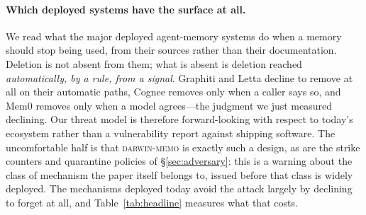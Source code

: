 \paragraph{Which deployed systems have the surface at all.}
We read what the major deployed agent-memory systems do when a memory
should stop being used, from their sources rather than their
documentation. Deletion is not absent from them; what is absent is
deletion reached \emph{automatically, by a rule, from a signal}.
Graphiti and Letta decline to remove at all on their automatic paths,
Cognee removes only when a caller says so, and Mem0 removes only when a
model agrees---the judgment we just measured declining. Our threat model
is therefore forward-looking with respect to today's ecosystem rather
than a vulnerability report against shipping software. The uncomfortable
half is that \textsc{darwin-memo} is exactly such a design, as are the
strike counters and quarantine policies of \S\ref{sec:adversary}: this
is a warning about the class of mechanism the paper itself belongs to,
issued before that class is widely deployed. The mechanisms deployed
today avoid the attack largely by declining to forget at all, and
Table~\ref{tab:headline} measures what that costs.

